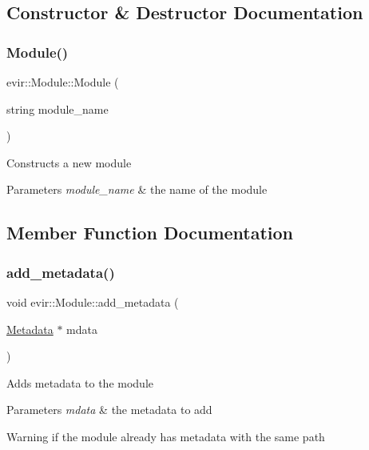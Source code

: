 \subsection{Constructor \& Destructor Documentation}
\mbox{\label{classevir_1_1Module_afb986e24396120d52ecd28c793948750}} 
\subsubsection{\texorpdfstring{Module()}{Module()}}
{\footnotesize\ttfamily evir\+::\+Module\+::\+Module (\begin{DoxyParamCaption}\item[{string}]{module\+\_\+name }\end{DoxyParamCaption})}

Constructs a new module 
\begin{DoxyParams}{Parameters}
{\em module\+\_\+name} & the name of the module \\
\hline
\end{DoxyParams}


\subsection{Member Function Documentation}
\mbox{\label{classevir_1_1Module_a8e8193a7ab86fb626058bd6135f8e2f8}} 
\subsubsection{\texorpdfstring{add\+\_\+metadata()}{add\_metadata()}}
{\footnotesize\ttfamily void evir\+::\+Module\+::add\+\_\+metadata (\begin{DoxyParamCaption}\item[{\hyperlink{classevir_1_1Metadata}{Metadata} $\ast$}]{mdata }\end{DoxyParamCaption})}

Adds metadata to the module 
\begin{DoxyParams}{Parameters}
{\em mdata} & the metadata to add \\
\hline
\end{DoxyParams}
\begin{DoxyWarning}{Warning}
if the module already has metadata with the same path 
\end{DoxyWarning}
\mbox{\label{classevir_1_1Module_a4f0d16ffaa997fe034b89b476825ac51}} 
